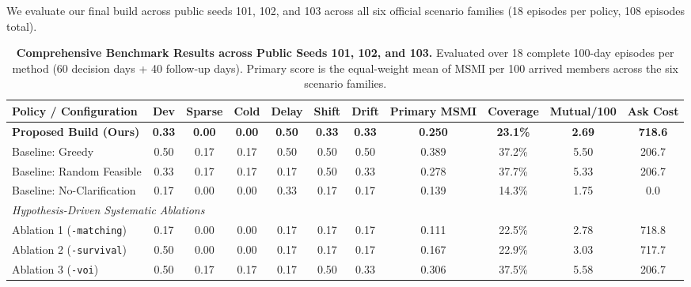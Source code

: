 \documentclass[10pt,twocolumn,letterpaper]{article}
\begin{document}
We evaluate our final build across public seeds 101, 102, and 103 across all six official scenario families (18 episodes per policy, 108 episodes total).

\begin{table}[t]
\centering
\small
\caption{\textbf{Comprehensive Benchmark Results across Public Seeds 101, 102, and 103.} Evaluated over 18 complete 100-day episodes per method (60 decision days + 40 follow-up days). Primary score is the equal-weight mean of MSMI per 100 arrived members across the six scenario families.}
\label{tab:benchmark}
\begin{tabular}{lcccccccccc}
\toprule
\textbf{Policy / Configuration} & \textbf{Dev} & \textbf{Sparse} & \textbf{Cold} & \textbf{Delay} & \textbf{Shift} & \textbf{Drift} & \textbf{Primary MSMI} & \textbf{Coverage} & \textbf{Mutual/100} & \textbf{Ask Cost} \\
\midrule
\textbf{Proposed Build (Ours)} & \textbf{0.33} & \textbf{0.00} & \textbf{0.00} & \textbf{0.50} & \textbf{0.33} & \textbf{0.33} & \textbf{0.250} & \textbf{23.1\%} & \textbf{2.69} & \textbf{718.6} \\
Baseline: Greedy & 0.50 & 0.17 & 0.17 & 0.50 & 0.50 & 0.50 & 0.389 & 37.2\% & 5.50 & 206.7 \\
Baseline: Random Feasible & 0.33 & 0.17 & 0.17 & 0.17 & 0.50 & 0.33 & 0.278 & 37.7\% & 5.33 & 206.7 \\
Baseline: No-Clarification & 0.17 & 0.00 & 0.00 & 0.33 & 0.17 & 0.17 & 0.139 & 14.3\% & 1.75 & 0.0 \\
\midrule
\multicolumn{11}{l}{\textit{Hypothesis-Driven Systematic Ablations}} \\
Ablation 1 (\texttt{-matching}) & 0.17 & 0.00 & 0.00 & 0.17 & 0.17 & 0.17 & 0.111 & 22.5\% & 2.78 & 718.8 \\
Ablation 2 (\texttt{-survival}) & 0.50 & 0.00 & 0.00 & 0.17 & 0.17 & 0.17 & 0.167 & 22.9\% & 3.03 & 717.7 \\
Ablation 3 (\texttt{-voi}) & 0.50 & 0.17 & 0.17 & 0.17 & 0.50 & 0.33 & 0.306 & 37.5\% & 5.58 & 206.7 \\
\bottomrule
\end{tabular}
\end{table}
\end{document}
